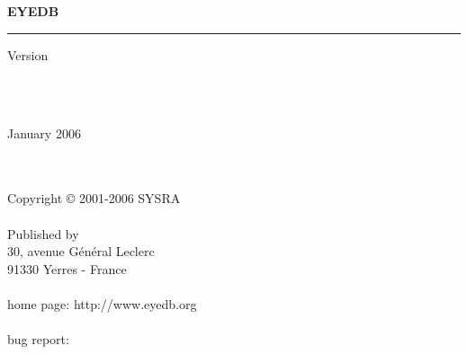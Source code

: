 
\thispagestyle{empty}

\mbox{ }
\\
\vspace{3 cm}
\\
{\bf{\Huge E{\LARGE YE}DB} \hspace{0.cm} {\Huge \mantitle}}
\\
\newcommand{\rulewidth}{15.4cm}
\rule{\rulewidth}{1.6mm}
\begin{flushright}
{\large Version \eyedbversion}
\end{flushright}
\mbox{ }
\\
\vspace{11 cm}
\\
\begin{flushright}
{\large January 2006}
\end{flushright}

\newpage

\thispagestyle{empty}

\mbox{ }
\\
\vspace{1cm}
\\
Copyright {\copyright} 2001-2006 SYSRA
\\
\vspace{1cm}
\\
Published by \sysra
\\
30, avenue G\'en\'eral Leclerc
\\
91330 Yerres - France
\\
\\
home page: http://www.eyedb.org
\\
\\
bug report: \bugreport
